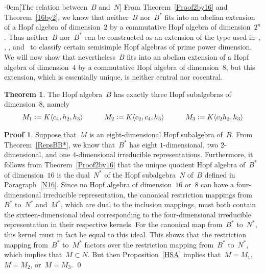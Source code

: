 \documentclass{article}
\makeatletter
\renewcommand{\subsection}{\@startsection{subsection}{2}{0em}%
{\baselineskip}{-0em}{\bfseries\normalsize}}
\numberwithin{equation}{section}
\theoremstyle{definition}
\newtheorem*{pf}{Proof}
\newtheorem*{thm}{Theorem}
\theoremstyle{break}
\newcommand{\deq}{\vcentcolon =}
\newcommand{\1}{{(1)}}
\newcommand{\2}{{(2)}}
\newcommand{\3}{{(3)}}
\makeatother
\begin{document}
\subsection[The relation between~$B$ and~$N$]{} \label{BN}
From Theorem~\ref{Proof2by16} and Theorem~\ref{16by2}, we know that neither~$B$ nor~$B^*$ fits into an abelian extension of a Hopf algebra of dimension~$2$ by a commutative Hopf algebra of dimension~$2^n$. Thus neither~$B$ nor~$B^*$ can be constructed as an extension of the type used in~\cite{Ka}, \cite{Ka2}, \cite{Ka3}, and~\cite{Ma1} to classify certain semisimple Hopf algebras of prime power dimension. We will now show that nevertheless~$B$ fits into an abelian extension of  a Hopf algebra of dimension~$4$ by a commutative Hopf algebra of dimension~$8$, but this extension, which is essentially unique, is neither central nor cocentral.
\begin{thm} \label{all8}
The Hopf algebra~$B$ has exactly three Hopf subalgebras of dimension~$8$, namely
\begin{align*}
M_1 \deq K\langle c_4, h_2, h_3 \rangle \qquad \quad
M_2 \deq K\langle c_2, c_4, h_3 \rangle \qquad \quad
M_3 \deq K\langle c_2 h_2, h_3 \rangle
\end{align*}
\end{thm}
\begin{pf}
Suppose that~$M$ is an eight-dimensional Hopf subalgebra of~$B$. From Theorem~\ref{RepsBB*}, we know that~$B^*$ has eight $1$-dimensional, two $2$-dimensional, and one $4$-dimensional irreducible representations. Furthermore, it follows from Theorem~\ref{Proof2by16} that the unique quotient Hopf algebra of~$B^*$ of dimension~$16$ is the dual~$N^*$ of the Hopf subalgebra~$N$ of~$B$ defined in Paragraph~\ref{N16}. Since no Hopf algebra of dimension~$16$ or~$8$ can have a four-dimensional irreducible representation, the canonical restriction mappings from~$B^*$ to~$N^*$ and~$M^*$, which are dual to the inclusion mappings, must both contain the sixteen-dimensional ideal corresponding to the four-dimensional irreducible representation in their respective kernels. For the canonical map from~$B^*$ to~$N^*$, this kernel must in fact be equal to this ideal. This shows that the restriction mapping from~$B^*$ to~$M^*$ factors over the restriction mapping from~$B^*$ to~$N^*$, which implies that~$M \subset N$. But then Proposition~\ref{HSA} implies that~$M=M_1$, $M=M_2$, or~$M=M_3$.
\qed
\end{pf}
\end{document}
